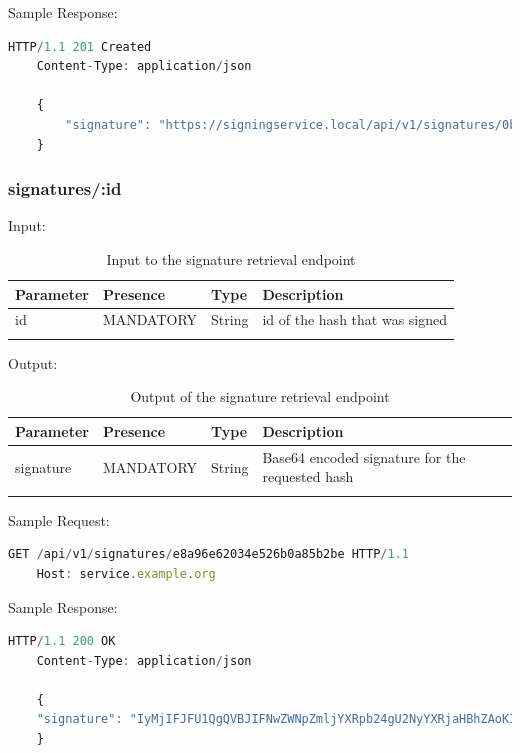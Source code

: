 Sample Response:

\begin{lstlisting}[caption={sign response}, captionpos=b, language=JavaScript, label={lst:signresponse}]
    HTTP/1.1 201 Created
    Content-Type: application/json

    {
        "signature": "https://signingservice.local/api/v1/signatures/0b1131ca0b68f3d55b8e32a55e8"
    }
\end{lstlisting}

\subsubsection{signatures/:id}
Input:

\begin{longtable}{|l|l|l|l|}
    \hline
    \textbf{Parameter} & \textbf{Presence} & \textbf{Type} & \textbf{Description} \\ \hline
    id & MANDATORY & String & id of the hash that was signed \\ \hline
    \caption{Input to the signature retrieval endpoint}
\end{longtable}

Output:

\begin{longtable}{|l|l|l|l|}
    \hline
    \textbf{Parameter} & \textbf{Presence} & \textbf{Type} & \textbf{Description} \\ \hline
    signature & MANDATORY & String & Base64 encoded signature for the requested hash \\ \hline
    \caption{Output of the signature retrieval endpoint}
\end{longtable}

Sample Request:

\begin{lstlisting}[caption={signature request}, captionpos=b, language=JavaScript, label={lst:signaturerequest}]
    GET /api/v1/signatures/e8a96e62034e526b0a85b2be HTTP/1.1
    Host: service.example.org
\end{lstlisting}

Sample Response:

\begin{lstlisting}[caption={signature response}, captionpos=b, language=JavaScript, label={lst:signatureresponse}]
    HTTP/1.1 200 OK
    Content-Type: application/json

    {
    "signature": "IyMjIFJFU1QgQVBJIFNwZWNpZmljYXRpb24gU2NyYXRjaHBhZAoKIyMjIyBQcmUtQXV0aCBlbmRw...b2ludCAKIyMjIyMgRW5kcG9pbnQKYGBgUE9TVCAvYXBpL3YxL3NpZ25gYGAK"
    }
\end{lstlisting}

